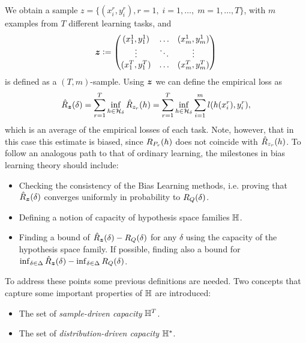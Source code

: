 We obtain a sample $z=\{(x_i^r, y_i^r), r=1,\; i=1, \ldots, \;m=1, \ldots, T\}$, with $m$ examples from $T$ different learning tasks, and
\begin{equation}
    \nonumber
    \bm{z} \vcentcolon= 
    \begin{pmatrix}
        (x_1^1, y_1^1) & \ldots & (x_m^1, y_m^1) \\
        \vdots & \ddots & \vdots \\
        (x_1^T, y_1^T) & \ldots & (x_m^T, y_m^T) \\
    \end{pmatrix}
\end{equation}
is defined as a $(T, m)$-sample.
Using $\bm{z}$ we can define the empirical loss as
\begin{equation}\label{eq:biaslearn_emprisk}
    \bemprisk(\delta) = \sum_{r=1}^\ntasks \inf_{\hypf \in \hypspace_\delta} \hat{\risk}_{\sample_r}(\hypf) = \sum_{r=1}^\ntasks \inf_{\hypf \in \hypspace_\delta} \sum_{i=1}^m l(\hypf(x_i^r), y_i^r),
\end{equation}
which is an average of the empirical losses of each task. Note, however, that in this case this estimate is biased, since $R_{P_r}(h)$ does not coincide with $\hat{R}_{z_r}(h)$. 
To follow an analogous path to that of ordinary learning, the milestones in bias learning theory should include:
\begin{itemize}
    \item Checking the consistency of the Bias Learning methods, i.e. proving that $\hat{R}_{\bm{z}}(\delta)$ converges uniformly in probability to $R_Q(\delta)$.
    \item Defining a notion of capacity of hypothesis space families $\mathbb{H}$.
    \item Finding a bound of $\hat{R}_{\bm{z}}(\delta) - R_Q(\delta)$ for any $\delta$ using the capacity of the hypothesis space family. If possible, finding also a bound for $\inf_{\delta \in \Delta}\hat{R}_{\bm{z}}(\delta) - \inf_{\delta \in \Delta} R_Q(\delta)$.
\end{itemize}
To address these points some previous definitions are needed. Two concepts that capture some important properties of $\mathbb{H}$ are introduced:
\begin{itemize}
    \item The set of \emph{sample-driven capacity} $\mathbb{H}^T$.
    \item The set of \emph{distribution-driven capacity} $\mathbb{H}^*$.
\end{itemize}

